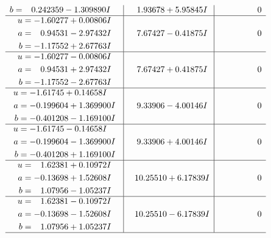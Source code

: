 \documentclass[1p]{elsarticle_modified}
\theoremstyle{definition}
\begin{document}
$$\begin{array}{c|c|c}
\begin{aligned}
b &= \phantom{-}0.242359 - 1.309890 I\end{aligned}
 & \phantom{-}1.93678 + 5.95845 I & \phantom{-0.000000 } 0 \\ \hline\begin{aligned}
u &= -1.60277 + 0.00806 I \\
a &= \phantom{-}0.94531 - 2.97432 I \\
b &= -1.17552 + 2.67763 I\end{aligned}
 & \phantom{-}7.67427 - 0.41875 I & \phantom{-0.000000 } 0 \\ \hline\begin{aligned}
u &= -1.60277 - 0.00806 I \\
a &= \phantom{-}0.94531 + 2.97432 I \\
b &= -1.17552 - 2.67763 I\end{aligned}
 & \phantom{-}7.67427 + 0.41875 I & \phantom{-0.000000 } 0 \\ \hline\begin{aligned}
u &= -1.61745 + 0.14658 I \\
a &= -0.199604 + 1.369900 I \\
b &= -0.401208 - 1.169100 I\end{aligned}
 & \phantom{-}9.33906 - 4.00146 I & \phantom{-0.000000 } 0 \\ \hline\begin{aligned}
u &= -1.61745 - 0.14658 I \\
a &= -0.199604 - 1.369900 I \\
b &= -0.401208 + 1.169100 I\end{aligned}
 & \phantom{-}9.33906 + 4.00146 I & \phantom{-0.000000 } 0 \\ \hline\begin{aligned}
u &= \phantom{-}1.62381 + 0.10972 I \\
a &= -0.13698 + 1.52608 I \\
b &= \phantom{-}1.07956 - 1.05237 I\end{aligned}
 & \phantom{-}10.25510 + 6.17839 I & \phantom{-0.000000 } 0 \\ \hline\begin{aligned}
u &= \phantom{-}1.62381 - 0.10972 I \\
a &= -0.13698 - 1.52608 I \\
b &= \phantom{-}1.07956 + 1.05237 I\end{aligned}
 & \phantom{-}10.25510 - 6.17839 I & \phantom{-0.000000 } 0\\
 \hline 
 \end{array}$$\newpage$$\begin{array}{c|c|c}  

\end{array}$$
\end{document}
